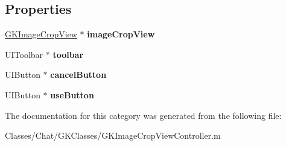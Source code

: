\subsection*{Properties}
\begin{DoxyCompactItemize}
\item 
\hypertarget{category_g_k_image_crop_view_controller_07_08_a57384eea570d0aa4febb15cb33674b8a}{}\hyperlink{interface_g_k_image_crop_view}{G\+K\+Image\+Crop\+View} $\ast$ {\bfseries image\+Crop\+View}\label{category_g_k_image_crop_view_controller_07_08_a57384eea570d0aa4febb15cb33674b8a}

\item 
\hypertarget{category_g_k_image_crop_view_controller_07_08_a028d5d7ff83bf9ebb5f0c4c700870db6}{}U\+I\+Toolbar $\ast$ {\bfseries toolbar}\label{category_g_k_image_crop_view_controller_07_08_a028d5d7ff83bf9ebb5f0c4c700870db6}

\item 
\hypertarget{category_g_k_image_crop_view_controller_07_08_a54e59d484e7ab37b65cc70048421a9a4}{}U\+I\+Button $\ast$ {\bfseries cancel\+Button}\label{category_g_k_image_crop_view_controller_07_08_a54e59d484e7ab37b65cc70048421a9a4}

\item 
\hypertarget{category_g_k_image_crop_view_controller_07_08_a4c818512feadb7769fd4a424d9cd0e93}{}U\+I\+Button $\ast$ {\bfseries use\+Button}\label{category_g_k_image_crop_view_controller_07_08_a4c818512feadb7769fd4a424d9cd0e93}

\end{DoxyCompactItemize}


The documentation for this category was generated from the following file\+:\begin{DoxyCompactItemize}
\item 
Classes/\+Chat/\+G\+K\+Classes/G\+K\+Image\+Crop\+View\+Controller.\+m\end{DoxyCompactItemize}
